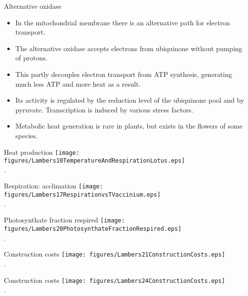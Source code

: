 \documentclass[10pt]{beamer}
\begin{document}
\begin{frame}{Alternative oxidase}
    \begin{itemize}
        \item In the mitochondrial membrane there is an
        alternative path for electron transport.
        \item The alternative oxidase accepts electrons from ubiquinone
        without pumping of protons.
        \item This partly decouples electron transport from ATP
        synthesis, generating much less ATP and more heat as a
        result.
        \item Its activity is regulated by the reduction level of the ubiquinone
        pool and by pyruvate. Transcription is induced by various stress factors.
        \item Metabolic heat generation is rare in plants, but exists in
        the flowers of some species.
    \end{itemize}
\end{frame}

\begin{frame}{Heat production}
    \centering
    \texttt{[image: figures/Lambers10TemperatureAndRespirationLotus.eps]}\\
    {\small \autocite[from][]{LambersEtAl1998}.}
\end{frame}

\begin{frame}{Respiration: acclimation}
    \centering
    \texttt{[image: figures/Lambers17RespirationvsTVaccinium.eps]}\\
    {\small \autocite[from][]{LambersEtAl1998}.}
\end{frame}

\begin{frame}{Photosynthate fraction respired}
    \centering
    \texttt{[image: figures/Lambers20PhotosynthateFractionRespired.eps]}\\
    {\small \autocite[from][]{LambersEtAl1998}.}
\end{frame}

\begin{frame}{Construction costs}
    \centering
    \texttt{[image: figures/Lambers21ConstructionCosts.eps]}\\
    {\small \autocite[from][]{LambersEtAl1998}.}
\end{frame}

\begin{frame}{Construction costs}
    \centering
    \texttt{[image: figures/Lambers24ConstructionCosts.eps]}\\
    {\small \autocite[from][]{LambersEtAl1998}.}
\end{frame}
\end{document}
